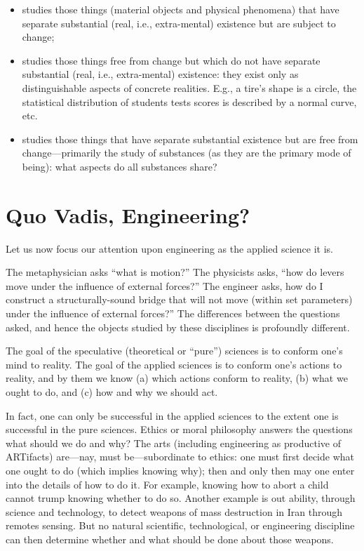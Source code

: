 \begin{itemize}
\item {} studies those things (material objects and physical phenomena) that have separate substantial (real, i.e., extra-mental) existence but are subject to change;
\item {} studies those things free from change but which do not have separate substantial (real, i.e., extra-mental) existence: they exist only as distinguishable aspects of concrete realities. E.g., a tire's shape is a circle, the statistical distribution of students tests scores is described by a normal curve, etc.
\item {} studies those things that have separate substantial existence but are free from change---primarily the study of substances (as they are the primary mode of being): what aspects do all substances share?
\end{itemize}

\section{Quo Vadis, Engineering?}

Let us now focus our attention upon engineering as the applied science it is.

The metaphysician asks ``what is motion?'' The physicists asks, ``how do levers move under the influence of external forces?'' The engineer asks, how do I construct a structurally-sound bridge that will not move (within set parameters) under the influence of external forces?'' The differences between the questions asked, and hence the objects studied by these disciplines is profoundly different.

The goal of the speculative (theoretical or ``pure'') sciences is to conform one's mind to reality. The goal of the applied sciences is to conform one's actions to reality, and by them we know (a) which actions conform to reality, (b) what we ought to do, and (c) how and why we should act.

In fact, one can only be successful in the applied sciences to the extent one is successful in the pure sciences. Ethics or moral philosophy answers the questions what should we do and why? The arts (including engineering as productive of ARTifacts) are---nay, must be---subordinate to ethics: one must first decide what one ought to do (which implies knowing why); then and only then may one enter into the details of how to do it. For example, knowing how to abort a child cannot trump knowing whether to do so. Another example is out ability, through science and technology, to detect weapons of mass destruction in Iran through remotes sensing. But no natural scientific, technological, or engineering discipline can then determine whether and what should be done about those weapons.

